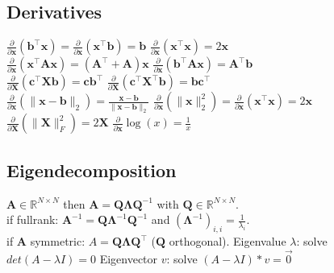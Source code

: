 \subsection*{Derivatives}
$\frac{\partial}{\partial \mathbf{x}}(\mathbf{b}^\top \mathbf{x}) = \frac{\partial}{\partial \mathbf{x}}(\mathbf{x}^\top \mathbf{b}) = \mathbf{b}$ \quad
$\frac{\partial}{\partial \mathbf{x}}(\mathbf{x}^\top \mathbf{x}) = 2\mathbf{x}$\\
$\frac{\partial}{\partial \mathbf{x}}(\mathbf{x}^\top \mathbf{A}\mathbf{x}) = (\mathbf{A}^\top + \mathbf{A})\mathbf{x}$ \quad
$\frac{\partial}{\partial \mathbf{x}}(\mathbf{b}^\top \mathbf{A}\mathbf{x}) = \mathbf{A}^\top \mathbf{b}$\\
$\frac{\partial}{\partial \mathbf{X}}(\mathbf{c}^\top \mathbf{X} \mathbf{b}) = \mathbf{c}\mathbf{b}^\top$ \quad
$\frac{\partial}{\partial \mathbf{X}}(\mathbf{c}^\top \mathbf{X}^\top \mathbf{b}) = \mathbf{b}\mathbf{c}^\top$\\
$\frac{\partial}{\partial \mathbf{x}}(\| \mathbf{x}-\mathbf{b} \|_2) = \frac{\mathbf{x}-\mathbf{b}}{\|\mathbf{x}-\mathbf{b}\|_2}$ \quad
$\frac{\partial}{\partial \mathbf{x}}(\|\mathbf{x}\|^2_2) = \frac{\partial}{\partial \mathbf{x}} (\mathbf{x}^\top \mathbf{x}) = 2\mathbf{x}$\\
$\frac{\partial}{\partial \mathbf{X}}(\|\mathbf{X}\|_F^2) = 2\mathbf{X}$ \quad
$\frac{\partial}{\partial \mathbf{x}}\log(x) = \frac{1}{x}$

\subsection*{Eigendecomposition}
$\mathbf{A} \in \mathbb{R}^{N \times N}$ then $\mathbf{A} = \mathbf{Q} \boldsymbol{\Lambda} \mathbf{Q}^{-1}$ with $\mathbf{Q} \in \mathbb{R}^{N \times N}$.\\
if fullrank: $\mathbf{A}^{-1} = \mathbf{Q} \boldsymbol{\Lambda}^{-1} \mathbf{Q}^{-1}$ and $(\boldsymbol{\Lambda}^{-1})_{i,i} = \frac{1}{\lambda_i}$.\\
if $\mathbf{A}$ symmetric: $A = \mathbf{Q} \boldsymbol{\Lambda} \mathbf{Q^\top}$ ($\mathbf{Q}$ orthogonal).
Eigenvalue $\lambda$: solve $det(A - \lambda I) = 0$
Eigenvector $v$: solve $(A - \lambda I)*v = \overrightarrow{0}$

